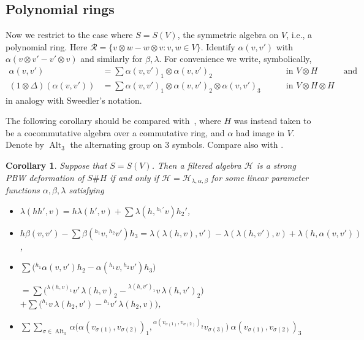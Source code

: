 \documentclass[11pt]{amsart}
\numberwithin{equation}{section}
\newtheorem{cor}[equation]{Corollary}
\DeclareMathOperator{\Alt}{Alt}
\newcommand{\chabl}{\cH_{\lambda,\alpha,\beta}}
\renewcommand{\_}[1]{\mbox{$_{\left( #1 \right)}$}}
\newcommand{\ot}{\otimes}
\newcommand{\Ho}{H}%
\newcommand{\cH}{\mathcal{H}}
\begin{document}
{\subsection*{Polynomial rings}
Now we restrict to the case where $S=S(V)$, the symmetric algebra on
$V$,
i.e., a polynomial ring.
Here $\mathcal{R}=\{v\ot w-w\ot v:v,w\in V\}$.
Identify $\alpha(v,v')$ with $\alpha(v\ot v'-v'\ot v)$ and similarly
for $\beta,\lambda$.
For convenience we write, symbolically,
\[
\begin{aligned}
    \alpha(v,v') &= 
\sum \alpha(v,v')_1 \ot \alpha(v,v')_2
&&\quad\text{ in $V\ot \Ho$}
\qquad\quad\text{and}\\
 (1\ot \Delta)(\alpha(v,v')) &= 
\sum \alpha(v,v')_1 \ot \alpha(v,v')_2 \ot \alpha(v,v')_3
&&\quad\text{ in $V\ot \Ho\ot \Ho$}
\end{aligned}
\]
in analogy with Sweedler's notation.

The following corollary should be compared with~\cite[Theorem 2.5]{Khare},
where $\Ho$ was instead taken to be a cocommutative algebra over
a commutative ring, and $\alpha$ had image in $V$.
Denote by $\Alt_3$ the alternating group on 3 symbols.
Compare  also with \cite[Theorem 2.5]{SW-Koszul}.


\begin{cor}
Suppose that $S=S(V)$.
Then a filtered algebra $\cH$ is a strong PBW deformation of $S\# \Ho$ if and only if
$\cH =\chabl$ for some linear parameter functions
$\alpha,\beta,\lambda$ satisfying 
\begin{itemize}\setlength{\itemindent}{-2ex}
\item[(1)]
   $\lambda(h h',v) = h\lambda(h',v) + \sum 
  \lambda(h , {}^{h_1'}v ) h_2'$,
\item[(2)]
    $h\beta(v,v') -\sum \beta( {}^{h_1}v, {}^{h_2}v') h_3 
    = \lambda(\lambda(h,v),v')-\lambda(\lambda(h,v'),v)
    +\lambda(h , \alpha(v,v'))$,
    \rule{0ex}{3ex}
\item[(3)]
   $ \sum \big( {}^{h_1}\alpha(v,v') h_2 - \alpha( {}^{h_1}v,
   {}^{h_2}v') h_3 \big)$
  \rule{0ex}{3ex}
  
$ = \sum\big( {}^{\lambda(h,v)_1}v'  \, \lambda(h,v)_2
    - {}^{\lambda(h,v')_1}v\, \lambda(h,v')_2\big)$
$ + \sum \big( {}^{h_1}v\, \lambda(h_2,v') - 
    {}^{h_1}v'\, \lambda(h_2,v)\big)$,
    \rule{0ex}{3ex}
  \item[(4)]
        $\sum\sum_{\sigma\in \Alt_3} \alpha \big( \alpha(v_{\sigma(1)},v_{\sigma(2)})_1,  
    {}^{\alpha(v_{\sigma(1)},v_{\sigma(2)})_2}v_{\sigma(3)} \big)
   \ \alpha(v_{\sigma(1)},v_{\sigma(2)})_3$
    \rule{0ex}{3ex}


\end{itemize}
\end{cor}}
\end{document}
